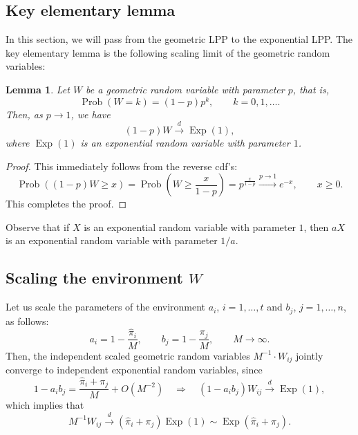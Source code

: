 \documentclass[letterpaper,11pt,oneside,reqno]{book}
\numberwithin{equation}{chapter}  %
\newtheorem{lemma}[proposition]{Lemma}
\theoremstyle{definition}
\begin{document}
\subsection{Key elementary lemma}

In this section, we will pass from the geometric LPP to the exponential LPP. The
key elementary lemma is the following scaling limit of the geometric random variables:
\begin{lemma}
	\label{lecture14:lemma:scaling_limit}
	Let $W$ be
	a geometric random variable with parameter $p$,
	that is,
	\begin{equation*}
		\operatorname{Prob}(W=k)=(1-p)p^k,\qquad k=0,1,\ldots.
	\end{equation*}
	Then, as $p \to 1$, we have
	\begin{equation}
		\label{lecture14:eq:scaling_limit}
		(1-p)W \xrightarrow{d} \operatorname{Exp}(1),
	\end{equation}
	where $\operatorname{Exp}(1)$ is an exponential random variable with parameter $1$.
\end{lemma}
\begin{proof}
	This immediately follows from
	the reverse cdf's:
	\begin{equation*}
		\operatorname{Prob}( (1-p)W \geq x ) = \operatorname{Prob}(W \geq \frac{x}{1-p}) =  p^{\frac{x}{1-p}}
		\xrightarrow{p \to 1}  e^{-x},\qquad  x\geq 0.
	\end{equation*}
	This completes the proof.
\end{proof}

Observe that if $X$ is an exponential random variable with parameter $1$, then
$a X$ is an exponential random variable with parameter $1/a$.

\subsection{Scaling the environment $W$}

Let us scale the parameters of the environment $a_i$, $i=1,\ldots,t$ and $b_j$, $j=1,\ldots,n$,
as follows:
\begin{equation*}
	a_i=1-\frac{\hat \pi_i}{M}, \qquad b_j=1-\frac{\pi_j}{M},\qquad M\to\infty.
\end{equation*}
Then, the independent scaled geometric random variables $M^{-1}\cdot W_{ij}$
jointly converge to independent exponential random variables, since
\begin{equation*}
	1-a_ib_j=\frac{\hat \pi_i+\pi_j}{M}+O(M^{-2})\quad \Rightarrow\quad
	(1-a_i b_j)W_{ij} \xrightarrow{d} \operatorname{Exp}(1),
\end{equation*}
which implies that
\begin{equation*}
	M^{-1}W_{ij} \xrightarrow{d} (\hat \pi_i+\pi_j)\operatorname{Exp}(1)\sim \operatorname{Exp}(\hat \pi_i+\pi_j).
\end{equation*}
\end{document}
